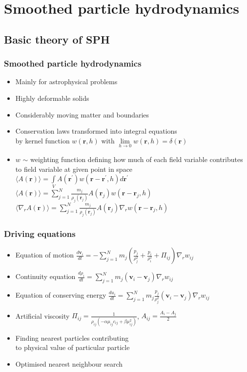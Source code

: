\documentclass{beamer}
\begin{document}
\section{Smoothed particle hydrodynamics}

\subsection{Basic theory of SPH}
\begin{frame}
\frametitle{Smoothed particle hydrodynamics}
\begin{itemize}
\item Mainly for astrophysical problems
\item Highly deformable solids
\item Considerably moving matter and boundaries
\item Conservation laws transformed into integral equations \\ by kernel function $w\left({\bm r}, h\right)$ with $\lim\limits_{h\rightarrow 0}w\left({\bm r}, h\right)=\delta\left({\bm r}\right)$
\item $w$ $\sim$ weighting function defining how much of each field variable contributes to field variable at given point in space \\
\vskip3mm
$\langle A\left({\bm r}\right)\rangle=\int\limits_V A\left({\bm r}^\prime\right)w\left({\bm r} - {\bm r}^\prime, h\right)d{\bm r}^\prime$ \\
$\langle A\left({\bm r}\right)\rangle=\sum\limits_{j=1}^{N}\frac{m_j}{\rho_j\left({\bm r}_j\right)}A\left({\bm r}_j\right)w\left({\bm r} - {\bm r}_j, h\right)$ \\
$\langle\nabla_r  A\left({\bm r}\right)\rangle=\sum\limits_{j=1}^{N}\frac{m_j}{\rho_j\left({\bm r}_j\right)}A\left({\bm r}_j\right)\nabla_r w\left({\bm r} - {\bm r}_j, h\right)$
\end{itemize}
\end{frame}

\begin{frame}
\frametitle{Driving equations}
\begin{itemize}
\item Equation of motion $\frac{d{\bm v}_i}{dt}=-\sum\limits_{j=1}^{N}m_j\left(\frac{p_j}{\rho_j^2}+\frac{p_i}{\rho_i^2}+\Pi_{ij}\right)\nabla_r w_{ij}$
\item Continuity equation $\frac{d\rho_i}{dt}=\sum\limits_{j=1}^{N}m_j\left({\bm v}_i-{\bm v}_j\right)\nabla_r w_{ij}$
\item Equation of conserving energy $\frac{du_i}{dt}=\sum\limits_{j=1}^{N}m_j\frac{p_j}{\rho_j^2}\left({\bm v}_i-{\bm v}_j\right)\nabla_r w_{ij}$
\item Artificial viscosity $\Pi_{ij}=\frac{1}{\rho_{ij}\left(-\alpha\mu_{ij}c_{ij}+\beta\mu_{ij}^2\right)}$, $A_{ij}=\frac{A_i-A_j}{2}$
\item Finding nearest particles contributing \\ to physical value of particular particle
\item Optimised nearest neighbour search
\end{itemize}
\end{frame}
\end{document}
